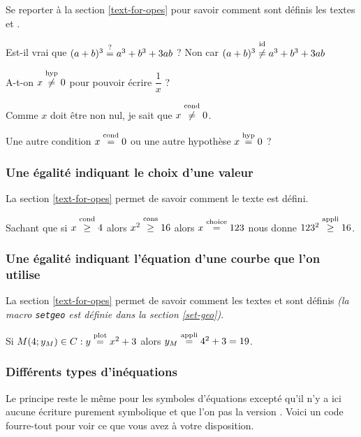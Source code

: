 \documentclass[12pt,a4paper]{article}
\newcommand\setgeo[1]{#1}
\begin{document}
Se reporter à la section \ref{text-for-opes} pour savoir comment sont définis les textes \emph{\og \textopcond \fg} et \emph{\og \textophyp \fg}.

\begin{tcblisting}{}
Est-il vrai que $(a + b)^3 \eqtest a^3 + b^3 + 3 a b$ ?
Non car $(a + b)^3 \neqid a^3 + b^3 + 3 a b$

A-t-on $x \neqhyp 0$ pour pouvoir écrire $\dfrac{1}{x}$ ?

Comme $x$ doit être non nul, je sait que $x \neqcond 0$.

Une autre condition $x \eqcond 0$ ou une autre hypothèse $x \eqhyp 0$ ?
\end{tcblisting}


\subsubsection{Une égalité indiquant le choix d'une valeur}

La section \ref{text-for-opes} permet de savoir comment le texte \emph{\og \textopchoice \fg} est défini.

\begin{tcblisting}{}
Sachant que si $x \geqcond 4$ alors $x^2 \geqcons 16$ alors $x \eqchoice 123$ nous
donne $123^2 \geqappli 16$.
\end{tcblisting}


\subsubsection{Une égalité indiquant l'équation d'une courbe que l'on utilise}

La section \ref{text-for-opes} permet de savoir comment les textes \emph{\og \textopplot \fg} et \emph{\og \textopappli \fg} sont définis \emph{(la macro \emph{\texttt{setgeo}} est définie dans la section \ref{set-geo})}.

\begin{tcblisting}{}
Si $M(4 ; y_M) \in \setgeo{C}: y \eqplot x^2 + 3$ alors $y_M \eqappli 4^2 + 3 = 19$.
\end{tcblisting}



\subsubsection{Différents types d'inéquations}

Le principe reste le même pour les symboles d'équations excepté qu'il n'y a ici aucune écriture purement symbolique et que l'on pas la version \emph{ \fg}. Voici un code \og fourre-tout \fg{} pour voir ce que vous avez à votre disposition.
\end{document}
